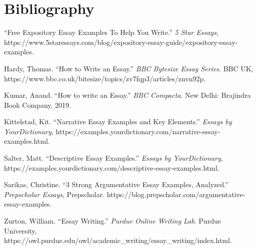 \chapter*{Bibliography}
\begin{flushleft}
	“Free Expository Essay Examples To Help You Write.” \textit{5 Star Essays}, https://www.5staressays.com/blog/expository-essay-guide/expository-essay-examples.


	Hardy, Thomas. “How to Write an Essay.” \textit{BBC Bytesize Essay Series}. BBC UK, https://www.bbc.co.uk/bitesize/topics/zv7fqp3/articles/znvn92p.


	Kumar, Anand. “How to write an Essay.” \textit{BBC Compacta}. New Delhi: Brajindra Book Company, 2019.


	Kittelstad, Kit. “Narrative Essay Examples and Key Elements.” \textit{Essays by YourDictionary}, https://examples.yourdictionary.com/narrative-essay-examples.html.
	
	
	Salter, Matt. “Descriptive Essay Examples.” \textit{Essays by YourDictionary}, https://examples.yourdictionary.com/descriptive-essay-examples.html.


	Sarikas, Christine. “3 Strong Argumentative Essay Examples, Analyzed.” \textit{Prepscholar Essays}, Prepscholar. https://blog.prepscholar.com/argumentative-essay-examples.


	Zurton, William. “Essay Writing.” \textit{Purdue Online Writing Lab}. Purdue University, https://owl.purdue.edu/owl/academic\_writing/essay\_writing/index.html.
\end{flushleft}

\afterpage{\blankpage}